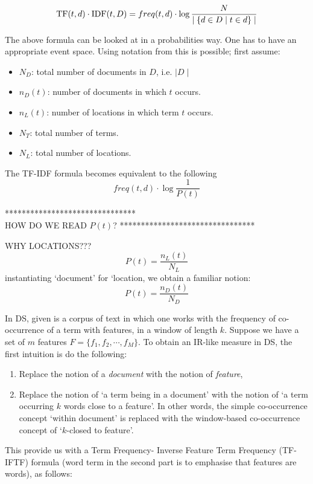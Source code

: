 \begin{equation}
\label{tf-idf}
\textmd{TF}(t,d) \cdot \textmd{IDF}(t, D) = freq(t, d) \cdot \log{{N} \over {\mid \{d \in D \mid t \in d\}\mid}}
\end{equation}

The above formula can be looked at in a probabilities way. One has to have an appropriate event space.  Using notation from   \cite{ThomasBook} this is possible;  first assume:
\begin{itemize}
\item $N_D$: total number of documents in $D$, i.e.   $\mid D \mid$
\item $n_D(t)$: number of documents in which $t$ occurs.
\item $n_L(t)$: number of locations in which  term $t$ occurs.
\item $N_T$: total number of terms.
\item $N_L$: total number of locations.
\end{itemize}

The  TF-IDF formula becomes equivalent to the following 
\[
 freq(t, d) \cdot \log{\frac{1}{P(t)}}
\]


*******************************\\
HOW DO WE READ $P(t)$?
********************************


WHY LOCATIONS???
\[
P(t) = \frac{n_L(t)}{N_L}
\] 
instantiating `document' for `location, we obtain a familiar notion: 
\[
P(t) = \frac{n_D(t)}{N_D} 
\]



In DS, given is a corpus of text in which one works with the frequency of co-occurrence of a term with  features, in a window of length $k$.  Suppose we have a set of  $m$ features  $F = \{f_1, f_2, \cdots, f_M\}$.  To obtain an IR-like measure in DS, the first intuition is do the following:

\begin{enumerate}
\item   Replace the notion of a  \emph{document}  with the notion of  \emph{feature}, 
\item  Replace the notion of `a term being in a document'  with the notion of `a term occurring $k$ words close to a feature'.  In other words,  the  simple co-occurrence concept `within document' is replaced with the window-based co-occurrence concept of  `$k$-closed to feature'. 
\end{enumerate}

This provide  us with a Term Frequency- Inverse Feature Term Frequency  (TF-IFTF) formula (word term in the second part is to emphasise that features are words),   as follows:

